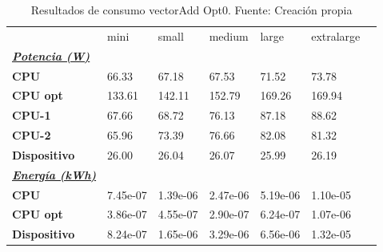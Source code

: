 \begin{table}[H]
    \centering
    \begin{tabular}{lllllll}
    \rowcolor[HTML]{DAE8FC} \ & mini & small & medium & 	large & 	extralarge \\
    \cellcolor[HTML]{DAE8FC} \textbf{\textbf{{\emph{{\underline{{Potencia (W)}}}}}}} &  &  &  & 	 & 	 \\
    \rowcolor[HTML]{EFEFEF} \cellcolor[HTML]{DAE8FC} \textbf{CPU} & 66.33 & 67.18 & 67.53 & 	71.52 & 	73.78 \\
    \cellcolor[HTML]{DAE8FC} \textbf{CPU opt} & 133.61 & 142.11 & 152.79 & 	169.26 & 	169.94 \\
    \rowcolor[HTML]{EFEFEF} \cellcolor[HTML]{DAE8FC} \textbf{\quad CPU-1} & 67.66 & 68.72 & 76.13 & 	87.18 & 	88.62 \\
    \cellcolor[HTML]{DAE8FC} \textbf{\quad CPU-2} & 65.96 & 73.39 & 76.66 & 	82.08 & 	81.32 \\
    \rowcolor[HTML]{EFEFEF} \cellcolor[HTML]{DAE8FC} \textbf{Dispositivo} & 26.00 & 26.04 & 26.07 & 	25.99 & 	26.19 \\
    \cellcolor[HTML]{DAE8FC} \textbf{\textbf{{\emph{{\underline{{Energía (kWh)}}}}}}} &  &  &  & 	 & 	 \\
    \rowcolor[HTML]{EFEFEF} \cellcolor[HTML]{DAE8FC} \textbf{CPU} & 7.45e-07 & 1.39e-06 & 2.47e-06 & 	5.19e-06 & 	1.10e-05 \\
    \cellcolor[HTML]{DAE8FC} \textbf{CPU opt} & 3.86e-07 & 4.55e-07 & 2.90e-07 & 	6.24e-07 & 	1.07e-06 \\
    \rowcolor[HTML]{EFEFEF} \cellcolor[HTML]{DAE8FC} \textbf{Dispositivo} & 8.24e-07 & 1.65e-06 & 3.29e-06 & 	6.56e-06 & 	1.32e-05 \\
    \end{tabular}
    \caption[Resultados de consumo vectorAdd Opt0]{{Resultados de consumo vectorAdd Opt0. Fuente: Creación propia}}
    \label{table_test_vectorAdd_Opt0_hw_powerResults}
\end{table}